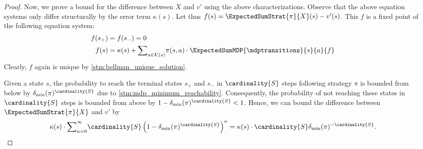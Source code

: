 \documentclass{theoretics}
\newcommand{\States}{S}
\newcommand{\strategy}{\pi}
\newcommand{\targetstate}{s_+}
\newcommand{\sinkstate}{s_-}
\begin{document}
\begin{proof}
	Now, we prove a bound for the difference between $X$ and $v'$ using the above characterizations.
	Observe that the above equation systems only differ structurally by the error term $\kappa(s)$.
	Let thus $f(s) = \ExpectedSumStrat{\strategy}{X}(s) - v'(s)$.
	This $f$ is a fixed point of the following equation system:
	\begin{align*}
		f(\targetstate) & = f(\sinkstate) = 0 \\
		f(s) & = \kappa(s) + {\sum}_{a \in \mathcal{K}(s)} \strategy(s, a) \cdot \ExpectedSumMDP{\mdptransitions}{s}{a}{f}
	\end{align*}
	Clearly, $f$ again is unique by \cref{stm:bellman_unique_solution}.

	Given a state $s$, the probability to reach the terminal states $\targetstate$ and $\sinkstate$ in $\cardinality{S}$ steps following strategy $\strategy$ is bounded from below by $\delta_{\min}(\strategy)^{\cardinality{\States}}$ due to \cref{stm:mdp_minimum_reachability}.
	Consequently, the probability of not reaching these states in $\cardinality{\States}$ steps is bounded from above by $1 - \delta_{\min}(\strategy)^{\cardinality{S}} < 1$.
	Hence, we can bound the difference between $\ExpectedSumStrat{\strategy}{X}$ and $v'$ by
	\begin{equation*}
		\kappa(s) \cdot {\sum}_{n=0}^\infty \cardinality{S} \left( 1 - \delta_{\min}(\strategy)^{\cardinality{S}} \right)^n = \kappa(s) \cdot \cardinality{S} \delta_{\min}(\strategy)^{-\cardinality{S}}. \qedhere 
	\end{equation*}
\end{proof}
\end{document}
